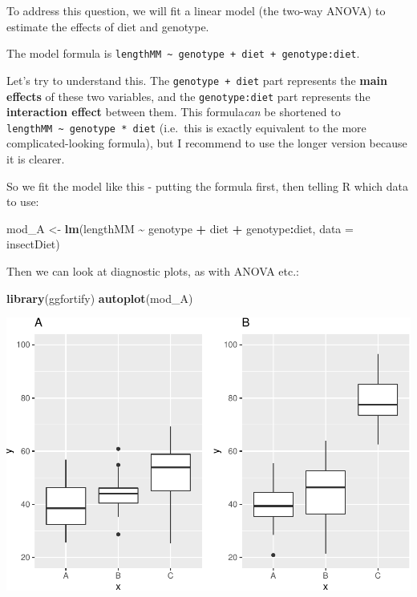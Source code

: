 \documentclass[
  a4paperpaper,
]{book}
\newenvironment{Shaded}{\begin{snugshade}}{\end{snugshade}}
\newcommand{\DataTypeTok}[1]{\textcolor[rgb]{0.13,0.29,0.53}{#1}}
\newcommand{\KeywordTok}[1]{\textcolor[rgb]{0.13,0.29,0.53}{\textbf{#1}}}
\newcommand{\NormalTok}[1]{#1}
\newcommand{\OperatorTok}[1]{\textcolor[rgb]{0.81,0.36,0.00}{\textbf{#1}}}
\newcommand{\StringTok}[1]{\textcolor[rgb]{0.31,0.60,0.02}{#1}}
\begin{document}
To address this question, we will fit a linear model (the two-way ANOVA) to estimate the effects of diet and genotype.

The model formula is \texttt{lengthMM\ \textasciitilde{}\ genotype\ +\ diet\ +\ genotype:diet}.

Let's try to understand this. The \texttt{genotype\ +\ diet} part represents the \textbf{main effects} of these two variables, and the \texttt{genotype:diet} part represents the \textbf{interaction effect} between them. This formula\emph{can} be shortened to \texttt{lengthMM\ \textasciitilde{}\ genotype\ *\ diet} (i.e.~this is exactly equivalent to the more complicated-looking formula), but I recommend to use the longer version because it is clearer.

So we fit the model like this - putting the formula first, then telling R which data to use:

\begin{Shaded}
\begin{Highlighting}[]
\NormalTok{mod\_A \textless{}{-}}\StringTok{ }\KeywordTok{lm}\NormalTok{(lengthMM }\OperatorTok{\textasciitilde{}}\StringTok{ }\NormalTok{genotype }\OperatorTok{+}\StringTok{ }\NormalTok{diet }\OperatorTok{+}\StringTok{ }\NormalTok{genotype}\OperatorTok{:}\NormalTok{diet, }\DataTypeTok{data =}\NormalTok{ insectDiet)}
\end{Highlighting}
\end{Shaded}

Then we can look at diagnostic plots, as with ANOVA etc.:

\begin{Shaded}
\begin{Highlighting}[]
\KeywordTok{library}\NormalTok{(ggfortify)}
\KeywordTok{autoplot}\NormalTok{(mod\_A)}
\end{Highlighting}
\end{Shaded}

\includegraphics{BB852_files/figure-latex/unnamed-chunk-204-1.pdf}
\end{document}
